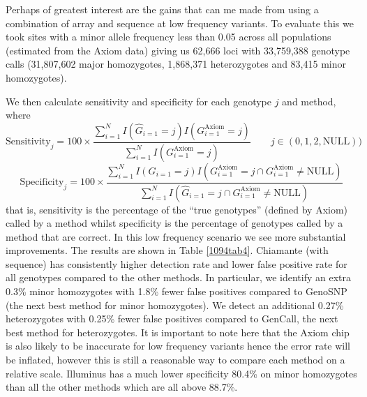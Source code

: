 Perhaps of greatest interest are the gains that can me made from using a combination of array and sequence at low frequency variants.  To evaluate this we took sites with a minor allele frequency less than 0.05 across all populations (estimated from the Axiom data) giving us 62,666 loci with 33,759,388 genotype calls (31,807,602 major homozygotes, 1,868,371 heterozygotes and 83,415 minor homozygotes). 

We then calculate sensitivity and specificity for each genotype $j$ and method, where
$$\textrm{Sensitivity}_j = 100 \times  \frac{\sum_{i=1}^N I(\hat{G}_{i=1} = j)I(G^{\textrm{Axiom}}_{i=1} = j)}{ \sum_{i=1}^N I(G^{\textrm{Axiom}}_{i=1} = j)} \qquad j \in (0,1,2,\textrm{NULL}))$$
$$\textrm{Specificity}_j = 100 \times  \frac{\sum_{i=1}^N I(G_{i=1} = j)I(G^{\textrm{Axiom}}_{i=1} = j \cap G^{\textrm{Axiom}}_{i=1} \neq \textrm{NULL})}{ \sum_{i=1}^N I(\hat{G}_{i=1} = j \cap G^{\textrm{Axiom}}_{i=1} \neq \textrm{NULL})}$$
that is, sensitivity is the percentage of the ``true genotypes'' (defined by Axiom) called by a method whilst specificity is the percentage of genotypes called by a method that are correct. 
\newpage
In this low frequency scenario we see more substantial improvements. The results are shown in Table \ref{1094tab4}. Chiamante (with sequence) has consistently higher detection rate and lower false positive rate for all genotypes compared to the other methods.  In particular, we identify an extra 0.3\% minor homozygotes with 1.8\% fewer false positives compared to GenoSNP (the next best method for minor homozygotes).  We detect an additional 0.27\% heterozygotes with 0.25\% fewer false positives compared to GenCall, the next best method for heterozygotes. It is important to note here that the Axiom chip is also likely to be inaccurate for low frequency variants hence the error rate will be inflated, however this is still a reasonable way to compare each method on a relative scale. Illuminus has a much lower specificity 80.4\% on minor homozygotes than all the other methods which are all above 88.7\%.  
